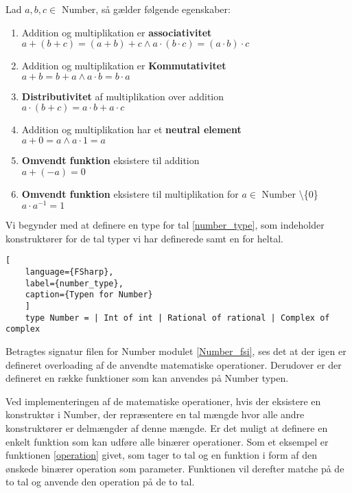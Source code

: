 \vspace{0.5cm}
\begin{egenskab}\label{egenskab:tal}
Lad $a, b, c \in $ Number, så gælder følgende egenskaber:
\begin{enumerate}
  \item Addition og multiplikation er \textbf{associativitet} \\ $a + (b + c) = (a + b) + c \land a \cdot (b \cdot c) = (a \cdot b) \cdot c$ 
  \item Addition og multiplikation er \textbf{Kommutativitet} \\ $a + b = b + a \land a \cdot b = b \cdot a$
  \item \textbf{Distributivitet} af multiplikation over addition\\ $a \cdot (b + c) = a \cdot b + a \cdot c$
  \item Addition og multiplikation har et \textbf{neutral element} \\ $a + 0 = a \land a \cdot 1 = a$
  \item \textbf{Omvendt funktion} eksistere til addition \\ $a + (-a) = 0$
  \item \textbf{Omvendt funktion} eksistere til multiplikation for $a \in$ Number \textbackslash \{0\} \\ $a \cdot a^{-1} = 1$
\end{enumerate}
\end{egenskab}

Vi begynder med at definere en type for tal \ref{number_type}, som indeholder konstruktører for de tal typer vi har definerede samt en for heltal. 

\begin{lstlisting}[
    language={FSharp}, 
    label={number_type}, 
    caption={Typen for Number}
    ]
    type Number = | Int of int | Rational of rational | Complex of complex
\end{lstlisting}

Betragtes signatur filen for Number modulet \ref{Number_fsi}, ses det at der igen er defineret overloading af de anvendte matematiske operationer. Derudover er der defineret en række funktioner som kan anvendes på Number typen. 



Ved implementeringen af de matematiske operationer, hvis der eksistere en konstruktør i Number, der repræsentere en tal mængde hvor alle andre konstruktører er delmængder af denne mængde. Er det muligt at definere en enkelt funktion som kan udføre alle binærer operationer. Som et eksempel er funktionen \ref{operation} givet, som tager to tal og en funktion i form af den ønskede binærer operation som parameter. Funktionen vil derefter matche på de to tal og anvende den operation på de to tal. 

